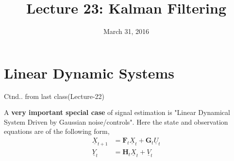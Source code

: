 \documentclass[a4paper,english,12pt]{article}
\title{Lecture 23: Kalman Filtering}
\date{March 31, 2016}
\author{}
\begin{document}
\maketitle
\maketitle
 \section{Linear Dynamic Systems}
Ctnd.. from last class(Lecture-22)\\
\par A \textbf{very important special case} of signal estimation is "Linear Dynamical System Driven by Gaussian noise/controls".
Here the state and observation equations are of the following form,
 \begin{align}
  \underline{X}_{t+1} &= \textbf{F}_t\underline{X}_t + \textbf{G}_t \underline{U}_t \\
  \underline{Y}_t &= \textbf{H}_t\underline{X}_t + \underline{V}_t
\end{align}
\end{document}

